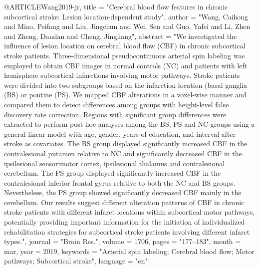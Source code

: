@ARTICLE{Wang2019-jr,
	title    = "Cerebral blood flow features in chronic subcortical stroke:
	Lesion location-dependent study",
	author   = "Wang, Caihong and Miao, Peifang and Liu, Jingchun and Wei, Sen
	and Guo, Yafei and Li, Zhen and Zheng, Dandan and Cheng,
	Jingliang",
	abstract = "We investigated the influence of lesion location on cerebral
	blood flow (CBF) in chronic subcortical stroke patients.
	Three-dimensional pseudocontinuous arterial spin labeling was
	employed to obtain CBF images in normal controls (NC) and
	patients with left hemisphere subcortical infarctions involving
	motor pathways. Stroke patients were divided into two subgroups
	based on the infarction location (basal ganglia (BS) or pontine
	(PS). We mapped CBF alterations in a voxel-wise manner and
	compared them to detect differences among groups with
	height-level false discovery rate correction. Regions with
	significant group differences were extracted to perform post hoc
	analyses among the BS, PS and NC groups using a general linear
	model with age, gender, years of education, and interval after
	stroke as covariates. The BS group displayed significantly
	increased CBF in the contralesional putamen relative to NC and
	significantly decreased CBF in the ipsilesional sensorimotor
	cortex, ipsilesional thalamus and contralesional cerebellum. The
	PS group displayed significantly increased CBF in the
	contralesional inferior frontal gyrus relative to both the NC and
	BS groups. Nevertheless, the PS group showed significantly
	decreased CBF mainly in the cerebellum. Our results suggest
	different alteration patterns of CBF in chronic stroke patients
	with different infarct locations within subcortical motor
	pathways, potentially providing important information for the
	initiation of individualized rehabilitation strategies for
	subcortical stroke patients involving different infarct types.",
	journal  = "Brain Res.",
	volume   =  1706,
	pages    = "177--183",
	month    =  mar,
	year     =  2019,
	keywords = "Arterial spin labeling; Cerebral blood flow; Motor pathways;
	Subcortical stroke",
	language = "en"
}

